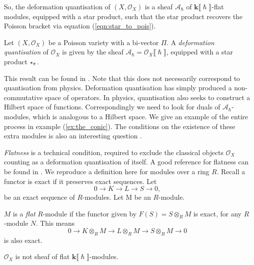     
    

    So, the deformation quantisation of \( (X,\mathcal{O}_X)\) is a sheaf \( \mathcal{A}_{\hslash}\) of  \( \mathbf{k}\lBrack \hslash\rBrack\)-flat modules, equipped with a star product, such that the star product recovers the Poisson bracket via equation (\ref{eqn:star_to_pois}). 

    \begin{defn} 
    \label{defn:def_quant}
    Let \( (X,\mathcal{O}_X)\) be a Poisson variety with a bi-vector \( \Pi\). A \emph{deformation quantisation} of \( \mathcal{O}_X\) is given by the sheaf \( \mathcal{A}_{\hslash} = \mathcal{O}_X \lBrack \hslash \rBrack \), equipped with a star product \( \starp_{\pi} \).
    \end{defn}
    
    This result can be found in \cite{yekutieli}. Note that this does not necessarily correspond to quantisation from physics. Deformation quantisation has simply produced a non-commutative space of operators. In physics, quantisation also seeks to construct a Hilbert space of functions. Correspondingly we need to look for duals of \( \mathcal{A}_{\hslash}\)-modules, which is analogous to a Hilbert space. We give an example of the entire process in example (\ref{ex:the_conic}). The conditions on the existence of these extra modules is also an interesting question \cite[section 2.4, page 15]{abpolyquant}. 

    \emph{Flatness} is a technical condition, required to exclude the classical objects \( \mathcal{O}_X\) counting as a deformation quantisation of itself. A good reference for flatness can be found in \cite{lang}. We reproduce a definition here for modules over a ring \(R\). Recall a functor is exact if it preserves exact sequences.
    Let \[ 0 \rightarrow K \rightarrow  L \rightarrow S \rightarrow 0, \] be an exact sequence of \(R\)-modules. Let  M be an \(R\)-module.
    \begin{defn}[Flatness]
     \(M\) is a \emph{flat} \(R\)-module if the functor given by \(F(S) = S \otimes_R M\) is exact, for any \(R\)-module \(N\). This means
     \[ 0 \rightarrow K \otimes_R M \rightarrow L \otimes_R M \rightarrow S \otimes_R M \rightarrow 0 \] is also exact.
    \end{defn}
    
    
    \(\mathcal{O}_X\) is not sheaf of flat \( \mathbf{k}\lBrack \hslash \rBrack\)-modules.

